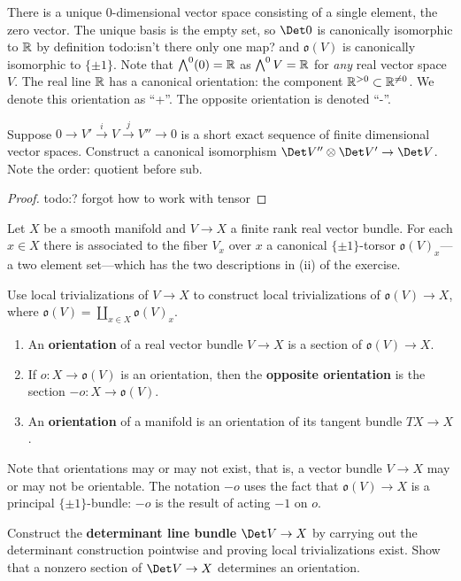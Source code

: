    There is a unique 0-dimensional vector space consisting of a single element, the zero vector. The unique basis is the empty set, so $\Det 0$ is canonically isomorphic to $\mathbb{R}$ by definition {\color{red}todo:isn't there only one map?} and $\mathfrak o(V)$ is canonically isomorphic to $\{\pm 1\} $. Note that $\bigwedge^0 (0)=\mathbb{R}$ as $\bigwedge ^0 V=\mathbb{R}$ for \emph{any} real vector space $V$. The real line $\mathbb{R}$ has a canonical orientation: the component $\mathbb{R}^{>0} \subset \mathbb{R}^{\neq 0}$. We denote this orientation as ``+''. The opposite orientation is denoted ``-''.
   \begin{ex}
       Suppose $0 \to V' \xrightarrow i V \xrightarrow jV '' \to 0$ is a short exact sequence of finite dimensional vector spaces. Construct a canonical isomorphism $\Det V'' \otimes \Det V' \to \Det V$. Note the order: quotient before sub.
   \end{ex}
   \begin{proof}
       {\color{red}todo:? forgot how to work with tensor} 
   \end{proof}
   Let $X$ be a smooth manifold and $V \to X$ a finite rank real vector bundle. For each $x \in X$ there is associated to the fiber $V_x$ over $x$ a canonical $\{\pm 1\} $-torsor $\mathfrak o(V)_x$--- a two element set---which has the two descriptions in (ii) of the exercise.
   \begin{ex}
       Use local trivializations of $V \to X$ to construct local trivializations of $\mathfrak o(V) \to X$, where $\mathfrak o(V)= \coprod _{x \in X}\mathfrak o(V)_x$.
   \end{ex}

   \begin{definition}[]
       \begin{enumerate}[label=(\roman*)]
       \setlength\itemsep{-.2em}
   \item An \textbf{orientation} of a real vector bundle $V \to X$ is a section of $\mathfrak o(V) \to X$.
   \item If $o \colon X \to \mathfrak o(V)$ is an orientation, then the \textbf{opposite orientation} is the section $-o \colon X \to \mathfrak o(V)$. 
\item An \textbf{orientation} of a manifold is an orientation of its tangent bundle $TX \to X$.
       \end{enumerate}
       Note that orientations may or may not exist, that is, a vector bundle $V \to X$ may or may not be orientable. The notation $-o$ uses the fact that $\mathfrak o(V) \to X$ is a principal $\{\pm 1\} $-bundle: $-o$ is the result of acting $-1$ on $o$.
   \end{definition}
   \begin{ex}
       Construct the \textbf{determinant line bundle} $\Det V \to X$ by carrying out the determinant construction pointwise and proving local trivializations exist. Show that a nonzero section of $\Det V \to X$ determines an orientation.
   \end{ex}


